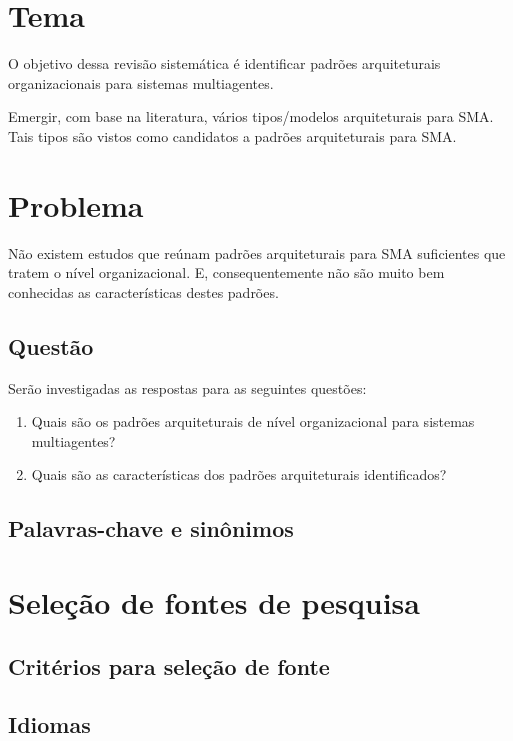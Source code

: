 
\section{Tema}

O objetivo dessa revisão sistemática é identificar padrões arquiteturais organizacionais para sistemas multiagentes.

Emergir, com base na literatura, vários tipos/modelos arquiteturais para SMA. Tais tipos são vistos como candidatos a padrões arquiteturais para SMA.

\section{Problema}

Não existem estudos que reúnam padrões arquiteturais para SMA suficientes que tratem o nível organizacional. E, consequentemente não são muito bem conhecidas as características destes padrões.

\subsection{Questão}

Serão investigadas as respostas para as seguintes questões:

\begin{enumerate}
    \item Quais são os padrões arquiteturais de nível organizacional para sistemas multiagentes?
    \item Quais são as características dos padrões arquiteturais identificados?
\end{enumerate}

\subsection{Palavras-chave e sinônimos}

\section{Seleção de fontes de pesquisa}

\subsection{Critérios para seleção de fonte}

\subsection{Idiomas}

